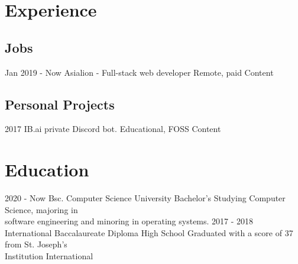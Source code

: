 \documentclass[]{jvcv}
\begin{document}
\section{Experience}

\subsection{Jobs}
\vspace{0.05cm}

\begin{jobslist}
	\jobentry
		{Jan 2019 - Now}
		{Asialion - Full-stack web developer}
		{Remote, paid}
		{Content}
\end{jobslist}

%
\vspace{0.1cm}
\subsection{Personal Projects}
\vspace{0.05cm}

\begin{projectslist}
	\projectentry
		{2017}
		{IB.ai {\normalfont private Discord bot.}}
		{Educational, FOSS}
		{Content}
\end{projectslist}

%
\vspace{0.5cm}
\section{Education}

\begin{edulist}
	\eduentry
		{2020 - Now}
		{Bsc. Computer Science}
		{University Bachelor's}
		{Studying Computer Science, majoring in\\
		software engineering and minoring in operating systems.}
	\eduentry
		{2017 - 2018}
		{International Baccalaureate Diploma}
		{High School}
		{Graduated with a score of 37 from St. Joseph's\\
		Institution International}
\end{edulist}
\end{document}
